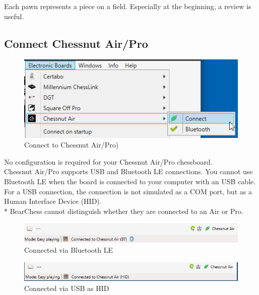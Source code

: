 \documentclass[11pt,a4paper]{article}
\begin{document}
Each pawn represents a piece on a field. Especially at the beginning, a review is useful. 

\subsection{Connect Chessnut Air/Pro} \label{ConnectChessnutAir}
\begin{figure}[H]
	\centering
	\includegraphics[scale=1.0]{ChessnutAir1.png}
	\caption{Connect to Chessnut Air/Pro) }
	\label{fig:ChessnutAir1}
\end{figure}

No configuration is required for your Chessnut Air/Pro chessboard.\\
Chessnut Air/Pro supports USB and Bluetooth LE connections. You cannot use Bluetooth LE when the board is connected to your computer with an USB cable.\\
For a USB connection, the connection is not simulated as a COM port, but as a Human Interface Device (HID).\\
{\color{red}*} BearChess cannot distinguish whether they are connected to an Air or Pro.

\begin{figure}[H]
	\centering
	\includegraphics[scale=0.7]{ChessnutAir2.png}
	\caption{Connected via Bluetooth LE}
	\label{fig:ChessnutAir2}
\end{figure}


\begin{figure}[H]
	\centering
	\includegraphics[scale=0.7]{ChessnutAir4.png}
	\caption{Connected via USB as HID}
	\label{fig:ChessnutAir4}
\end{figure}
\end{document}
